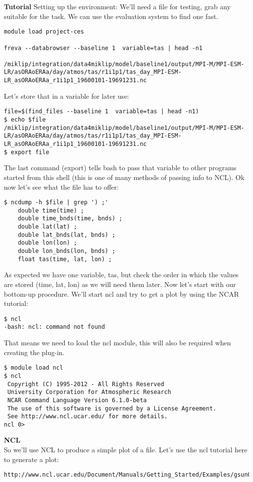 \documentclass[a4paper,11pt]{ltxdoc}
\begin{document}
\textbf{Tutorial}
Setting up the environment: We'll need a file for testing, grab any suitable for the task. We can use the evaluation system to find one fast.
\begin{lstlisting}
module load project-ces

freva --databrowser --baseline 1  variable=tas | head -n1

/miklip/integration/data4miklip/model/baseline1/output/MPI-M/MPI-ESM-LR/asORAoERAa/day/atmos/tas/r1i1p1/tas_day_MPI-ESM-LR_asORAoERAa_r1i1p1_19600101-19691231.nc
\end{lstlisting}
Let's store that in a variable for later use:
\begin{lstlisting}
file=$(find_files --baseline 1  variable=tas | head -n1)
$ echo $file
/miklip/integration/data4miklip/model/baseline1/output/MPI-M/MPI-ESM-LR/asORAoERAa/day/atmos/tas/r1i1p1/tas_day_MPI-ESM-LR_asORAoERAa_r1i1p1_19600101-19691231.nc
$ export file
\end{lstlisting}
The last command (export) tells bash to pass that variable to other programs started from this shell (this is one of many methods of passing info to NCL). Ok now let's see what the file has to offer:
\begin{lstlisting}
$ ncdump -h $file | grep ') ;'
    double time(time) ;
    double time_bnds(time, bnds) ;
    double lat(lat) ;
    double lat_bnds(lat, bnds) ;
    double lon(lon) ;
    double lon_bnds(lon, bnds) ;
    float tas(time, lat, lon) ;
\end{lstlisting}
As expected we have one variable, tas, but check the order in which the values are stored (time, lat, lon) as we will need them later.
Now let's start with our bottom-up procedure. We'll start ncl and try to get a plot by using the NCAR tutorial:
\begin{lstlisting}
$ ncl
-bash: ncl: command not found
\end{lstlisting}
That means we need to load the ncl module, this will also be required when creating the plug-in.
\begin{lstlisting}
$ module load ncl
$ ncl
 Copyright (C) 1995-2012 - All Rights Reserved
 University Corporation for Atmospheric Research
 NCAR Command Language Version 6.1.0-beta
 The use of this software is governed by a License Agreement.
 See http://www.ncl.ucar.edu/ for more details.
ncl 0> 
\end{lstlisting}
\textbf{NCL}\\
So we'll use NCL to produce a simple plot of a file. Let's use the ncl tutorial here to generate a plot:  \begin{lstlisting}http://www.ncl.ucar.edu/Document/Manuals/Getting_Started/Examples/gsun02n.shtml\end{lstlisting}
\end{document}
